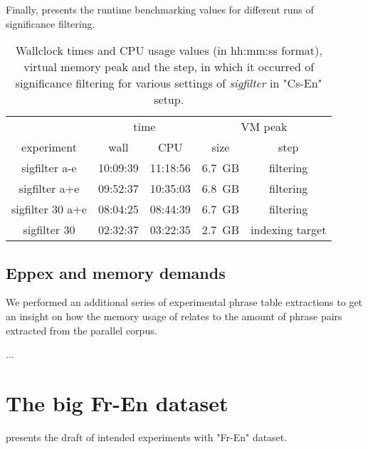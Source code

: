 Finally,  presents the runtime benchmarking
values for different runs of significance filtering.

\begin{table}[ht]
\centering
\begin{tabular}{ | c | c c | c c | }
\hline
 & \multicolumn{2}{|c|}{time} & \multicolumn{2}{|c|}{VM peak} \\
experiment & wall & CPU & size & step \\
\hline
\hline
sigfilter a-e     & 10:09:39 & 11:18:56 & 6.7~GB & filtering \\
sigfilter a+e     & 09:52:37 & 10:35:03 & 6.8~GB & filtering \\
sigfilter 30 a+e  & 08:04:25 & 08:44:39 & 6.7~GB & filtering \\
sigfilter 30      & 02:32:37 & 03:22:35 & 2.7~GB & indexing target \\
\hline
\end{tabular}
\caption{\label{cs-en-wmt13-sigfilter-runtime-benchmarks}
Wallclock times and CPU usage values (in hh:mm:ss format), virtual memory peak and the step, in which
it occurred of significance filtering for various settings of \emph{sigfilter} in "Cs-En" setup.}
\end{table}

\subsection{Eppex and memory demands}
\label{sec:eppex-memory-demands}


We performed an additional series of experimental phrase table extractions
to get an insight on how the memory usage of \eppex{} relates to the amount of
phrase pairs extracted from the parallel corpus.

...

\section{The big Fr-En dataset}
\label{sec:fr-en-results}

 presents the draft of intended experiments with "Fr-En" dataset.

